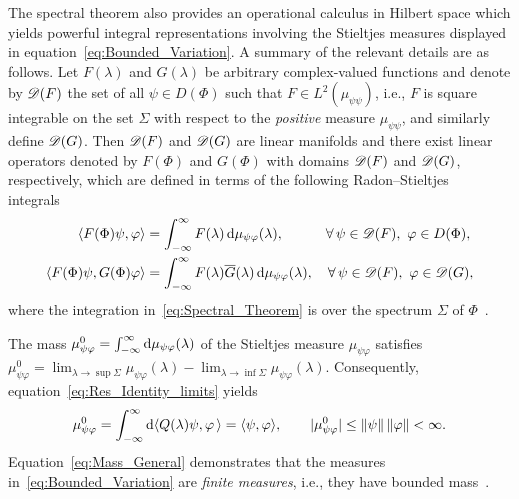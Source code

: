 \documentclass[amsa]{ipart}
\begin{document}
The spectral theorem also provides an operational calculus in Hilbert
space which yields powerful integral representations involving the
Stieltjes measures displayed in
equation~\eqref{eq:Bounded_Variation}. A summary of the relevant
details are as   
follows. Let $F(\lambda)$ and $G(\lambda)$ be arbitrary complex-valued functions
and denote by $\mathscr{D}(F)$ the set of all $\psi\in D(\Phi)$ such that
$F\in L^2(\mu_{\psi\psi})$, i.e., $F$ is square integrable on the set
$\Sigma$ with respect to the \emph{positive} measure $\mu_{\psi\psi}$, and similarly define
$\mathscr{D}(G)$. Then $\mathscr{D}(F)$ and $\mathscr{D}(G)$ are linear manifolds and there
exist linear operators denoted by $F(\Phi)$ and $G(\Phi)$ with domains
$\mathscr{D}(F)$ and $\mathscr{D}(G)$, respectively, which are defined in terms of the
following Radon--Stieltjes integrals~\cite{Stone:64}  
%
\begin{align}\label{eq:Spectral_Theorem}
  \langle F(\Phi)\psi,\varphi\rangle&=\int_{-\infty}^\infty F(\lambda)\,\d\mu_{\psi\varphi}(\lambda), \qquad
  \hspace{1em}
  \forall \, \psi\in\mathscr{D}(F), \ \varphi\in D(\Phi),  
  \\
  \langle F(\Phi)\psi,G(\Phi)\varphi\rangle&=\int_{-\infty}^\infty F(\lambda)\overline{G}(\lambda)\,\d\mu_{\psi\varphi}(\lambda),
  \quad
  \forall \, \psi\in\mathscr{D}(F), \ \varphi\in\mathscr{D}(G),
  \notag
\end{align}
%
where the integration in~\eqref{eq:Spectral_Theorem} is over the
spectrum $\Sigma$ of $\Phi$~\cite{Reed-1980,Stone:64}.



The mass $\mu^0_{\psi\varphi}=\int_{-\infty}^\infty\mathrm{d}\mu_{\psi\varphi}(\lambda)$ of the
Stieltjes measure $\mu_{\psi\varphi}$ satisfies~\cite{Stone:64}
$\mu^0_{\psi\varphi}=\lim_{\lambda\to\sup\Sigma}\mu_{\psi\varphi}(\lambda)-\lim_{\lambda\to\inf\Sigma}\mu_{\psi\varphi}(\lambda)$. Consequently,
equation~\eqref{eq:Res_Identity_limits} yields
% 
\begin{align}\label{eq:Mass_General}
  \mu^0_{\psi\varphi}=\int_{-\infty}^\infty\d\langle Q(\lambda)\psi,\varphi\,\rangle=\langle\psi,\varphi\rangle,
  \qquad
  |\mu^0_{\psi\varphi}|\leq\|\psi\|\,\|\varphi\|<\infty.
\end{align}
%
Equation~\eqref{eq:Mass_General} demonstrates that the measures
in~\eqref{eq:Bounded_Variation} are \emph{finite measures}, i.e., they
have bounded mass~\cite{Stone:64}.
\end{document}
